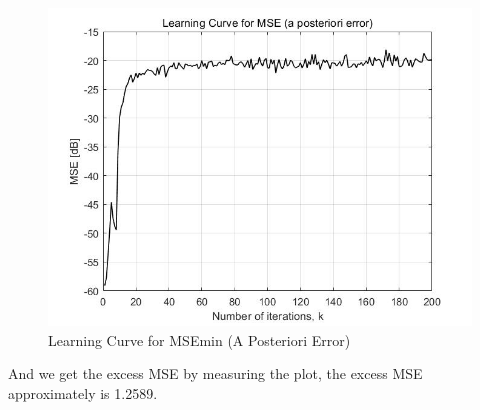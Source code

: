 \documentclass[UTF-8, a4paper, 12pt]{ctexart}
\begin{document}
\begin{figure}[htbp]
    \centering
    \includegraphics[width=13cm]{4.13/f3.jpg}
    \caption{Learning Curve for MSEmin (A Posteriori Error)}
\end{figure}

\newpage

And we get the excess MSE by measuring the plot, the excess MSE approximately is 1.2589.
\end{document}
